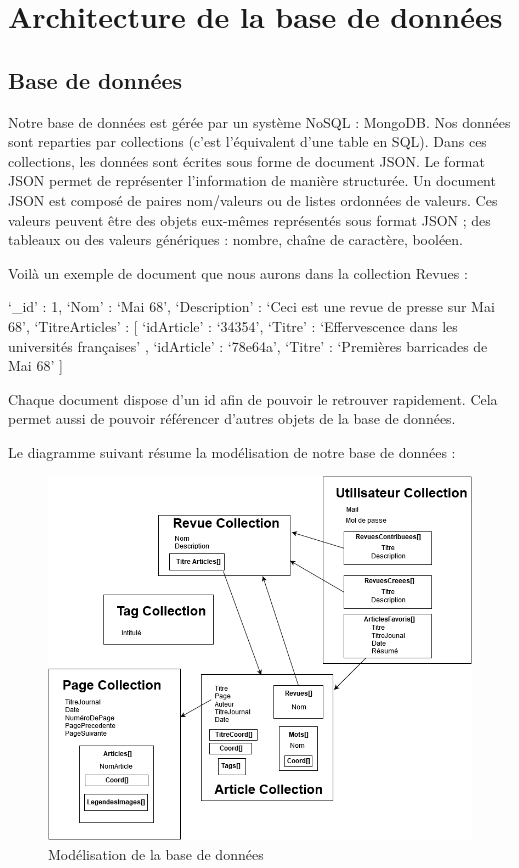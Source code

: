 \newpage
\section{Architecture de la base de données}
\label{sec:bdd}

\subsection{Base de données}

Notre base de données est gérée par un système NoSQL : MongoDB. Nos données sont reparties par collections (c’est l’équivalent d’une table en SQL). Dans ces collections, les données sont écrites sous forme de document JSON. Le format JSON permet de représenter l’information de manière structurée. Un document JSON est composé de paires nom/valeurs ou de listes ordonnées de valeurs. Ces valeurs peuvent être des objets eux-mêmes représentés sous format JSON ; des tableaux ou des valeurs génériques : nombre, chaîne de caractère, booléen. 


Voilà un exemple de document que nous aurons dans la collection Revues : 


\begin{verbatimtab}[3]
{
	‘_id’ : 1,
	‘Nom’ : ‘Mai 68’,
	‘Description’ : ‘Ceci est une revue de presse sur Mai 68’,
	‘TitreArticles’ : [ 
		{ ‘idArticle’ : ‘34354’, ‘Titre’ : ‘Effervescence dans les universités françaises’ },
		{ ‘idArticle’ : ‘78e64a’,  ‘Titre’ :	‘Premières barricades de Mai 68’ }
  ]
}
\end{verbatimtab}

Chaque document dispose d’un id afin de pouvoir le retrouver rapidement. Cela permet aussi de pouvoir référencer d’autres objets de la base de données. 

Le diagramme suivant résume la modélisation de notre base de données :


\begin{figure}[H]
        \centering
        \includegraphics[width=\textwidth]{figure/ModelBDD.png}
            \caption{Modélisation de la base de données}
            \label{fig:modelbdd}
\end{figure}

